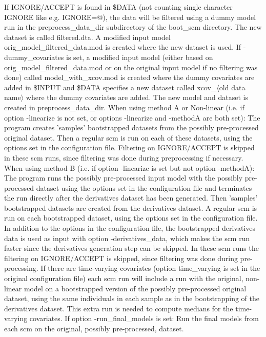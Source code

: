 If IGNORE/ACCEPT is found in \$DATA (not counting single character IGNORE like e.g. IGNORE=@), the data will be filtered using a dummy model run in the preprocess\_data\_dir subdirectory of the boot\_scm directory. The new dataset is called filtered.dta. A modified input model  orig\_model\_filtered\_data.mod is created where the new dataset is used.
If -dummy\_covariates is set, a modified input model (either based on orig\_model\_filtered\_data.mod or on the original input model if no filtering was done) called model\_with\_xcov.mod is created where the dummy covariates are added in \$INPUT and \$DATA specifies a new dataset called xcov\_$\langle$old data name$\rangle$ where the dummy covariates are added. The new model and dataset is created in preprocess\_data\_dir. 
When using method A or Non-linear (i.e. if option -linearize is not set, or options -linearize and -methodA are both set): The program creates 'samples' bootstrapped datasets from the possibly pre-processed original dataset. Then a regular scm is run on each of these datasets, using the options set in the configuration file. Filtering on IGNORE/ACCEPT is skipped in these scm runs, since filtering was done during preprocessing if necessary. 
When using method B (i.e. if option -linearize is set but not option -methodA): The program runs the possibly pre-processed input model with the possibly pre-processed dataset using the options set in the configuration file and terminates the run directly after the derivatives dataset has been generated. Then 'samples' bootstrapped datasets are created from the derivatives dataset. A regular scm is run on each bootstrapped dataset, using the options set in the configuration file. In addition to the options in the configuration file, the bootstrapped derivatives data is used as input with option -derivatives\_data, which makes the scm run faster since the derivatives generation step can be skipped. In these scm runs the filtering on IGNORE/ACCEPT is skipped, since filtering was done during pre-processing. If there are time-varying covariates (option time\_varying is set in the original configuration file) each scm run will include a run with the original, non-linear model on a bootstrapped version of the possibly pre-processed original dataset, using the same individuals in each sample as in the bootstrapping of the derivatives dataset. This extra run is needed to compute medians for the time-varying covariates. 
If option -run\_final\_models is set: Run the final models from each scm on the original, possibly pre-processed, dataset.

